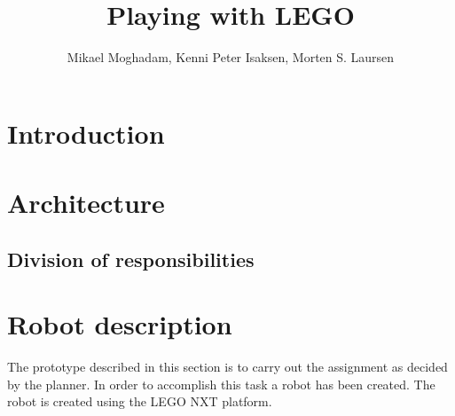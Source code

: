\documentclass[draft, english, a4paper]{article}
\title{Playing with LEGO}
\author{Mikael Moghadam, Kenni Peter Isaksen, Morten S. Laursen}
\begin{document}
\maketitle %


%
%
\section{Introduction}
\newpage
\section{Architecture}
	\subsection{Division of responsibilities}
\section{Robot description}
        The prototype described in this section is to carry out the assignment as
        decided by the planner. In order to accomplish this task a robot 
        has been created. The robot is created using the LEGO NXT platform.  
\end{document}
